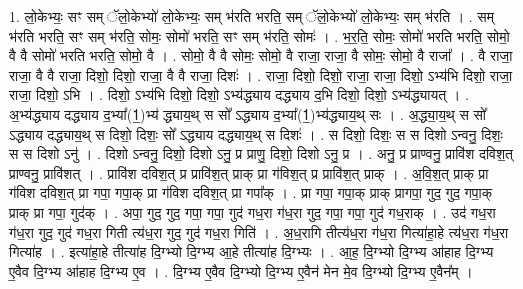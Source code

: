 \documentclass[17pt]{extarticle}
\begin{document}
1. लो॒केभ्यः॒ सꣳ सम् ॅलो॒केभ्यो॑ लो॒केभ्यः॒ सम् भ॑रति भरति॒ सम् ॅलो॒केभ्यो॑ लो॒केभ्यः॒ सम् भ॑रति । . सम् भ॑रति भरति॒ सꣳ सम् भ॑रति॒ सोमः॒ सोमो॑ भरति॒ सꣳ सम् भ॑रति॒ सोमः॑ । . भ॒र॒ति॒ सोमः॒ सोमो॑ भरति भरति॒ सोमो॒ वै वै सोमो॑ भरति भरति॒ सोमो॒ वै । . सोमो॒ वै वै सोमः॒ सोमो॒ वै राजा॒ राजा॒ वै सोमः॒ सोमो॒ वै राजा᳚ । . वै राजा॒ राजा॒ वै वै राजा॒ दिशो॒ दिशो॒ राजा॒ वै वै राजा॒ दिशः॑ । . राजा॒ दिशो॒ दिशो॒ राजा॒ राजा॒ दिशो॒ ऽभ्य॑भि दिशो॒ राजा॒ राजा॒ दिशो॒ ऽभि । . दिशो॒ ऽभ्य॑भि दिशो॒ दिशो॒ ऽभ्य॑द्ध्याय दद्ध्याय द॒भि दिशो॒ दिशो॒ ऽभ्य॑द्ध्यायत् । . अ॒भ्य॑द्ध्याय दद्ध्याय द॒भ्या᳚(1॒)भ्य॑ द्ध्याय॒थ् स सो᳚ ऽद्ध्याय द॒भ्या᳚(1॒)भ्य॑द्ध्याय॒थ् सः । . अ॒द्ध्या॒य॒थ् स सो᳚ ऽद्ध्याय दद्ध्याय॒थ् स दिशो॒ दिशः॒ सो᳚ ऽद्ध्याय दद्ध्याय॒थ् स दिशः॑ । . स दिशो॒ दिशः॒ स स दिशो ऽन्वनु॒ दिशः॒ स स दिशो ऽनु॑ । . दिशो ऽन्वनु॒ दिशो॒ दिशो ऽनु॒ प्र प्राणु॒ दिशो॒ दिशो ऽनु॒ प्र । . अनु॒ प्र प्राण्वनु॒ प्रावि॑श दविश॒त् प्राण्वनु॒ प्रावि॑शत् । . प्रावि॑श दविश॒त् प्र प्रावि॑श॒त् प्राक् प्रा ग॑विश॒त् प्र प्रावि॑श॒त् प्राक् । . अ॒वि॒श॒त् प्राक् प्रा ग॑विश दविश॒त् प्रा गपा॒ गपा॒क् प्रा ग॑विश दविश॒त् प्रा गपा᳚क् । . प्रा गपा॒ गपा॒क् प्राक् प्रागपा॒ गुद॒ गुद॒ गपा॒क् प्राक् प्रा गपा॒ गुद॑क् । . अपा॒ गुद॒ गुद॒ गपा॒ गपा॒ गुद॑ गध॒रा ग॑ध॒रा गुद॒ गपा॒ गपा॒ गुद॑ गध॒राक् । . उद॑ गध॒रा ग॑ध॒रा गुद॒ गुद॑ गध॒रा गिती त्य॑ध॒रा गुद॒ गुद॑ गध॒रा गिति॑ । . अ॒ध॒रागि तीत्य॑ध॒रा ग॑ध॒रा गित्या॑हा॒हे त्य॑ध॒रा ग॑ध॒रा गित्या॑ह । . इत्या॑हा॒हे तीत्या॑ह दि॒ग्भ्यो दि॒ग्भ्य आ॒हे तीत्या॑ह दि॒ग्भ्यः । . आ॒ह॒ दि॒ग्भ्यो दि॒ग्भ्य आ॑हाह दि॒ग्भ्य ए॒वैव दि॒ग्भ्य आ॑हाह दि॒ग्भ्य ए॒व । . दि॒ग्भ्य ए॒वैव दि॒ग्भ्यो दि॒ग्भ्य ए॒वैन॑ मेन मे॒व दि॒ग्भ्यो दि॒ग्भ्य ए॒वैन᳚म् । \newline
\end{document}
